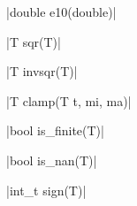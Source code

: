\item \vectorfunc \cppinline|double e10(double)| 

\item \vectorfunc \cppinline|T sqr(T)| 

\item \vectorfunc \cppinline|T invsqr(T)| 

\item \vectorfunc \cppinline|T clamp(T t, mi, ma)| 

\item \vectorfunc \cppinline|bool is_finite(T)| 

\item \vectorfunc \cppinline|bool is_nan(T)| 

\item \vectorfunc \cppinline|int_t sign(T)| 
